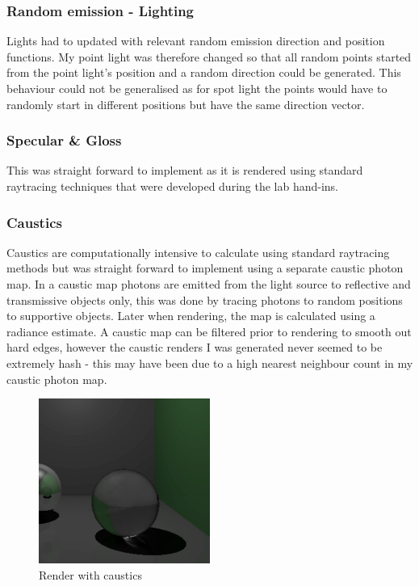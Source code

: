 \documentclass{article}
\begin{document}
\subsubsection{Random emission - Lighting}
Lights had to updated with relevant random emission direction and position functions. My point light was therefore changed so that all random points started from the point light's position and a random direction could be generated. This behaviour could not be generalised as for spot light the points would have to randomly start in different positions but have the same direction vector.

\subsubsection{Specular \& Gloss}
This was straight forward to implement as it is rendered using standard raytracing techniques that were developed during the lab hand-ins. 

\subsubsection{Caustics}
Caustics are computationally intensive to calculate using standard raytracing methods but was straight forward to implement using a separate caustic photon map. In a caustic map photons are emitted from the light source to reflective and transmissive objects only, this was done by tracing photons to random positions to supportive objects. Later when rendering, the map is calculated using a radiance estimate. A caustic map can be filtered prior to rendering to smooth out hard edges, however the caustic renders I was generated never seemed to be extremely hash - this may have been due to a high nearest neighbour count in my caustic photon map.

\begin{figure}[h]
\centering
\includegraphics[width=0.5\textwidth]{caustics}
\captionsetup{justification=centering,margin=0.5cm}
\caption{Render with caustics}
\label{fig:caustics}
\end{figure}
\end{document}
